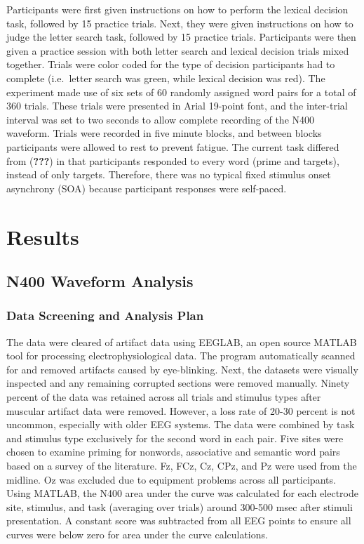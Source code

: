 \documentclass[english,man]{apa6}
\theoremstyle{definition}
\theoremstyle{definition}
\theoremstyle{definition}
\theoremstyle{remark}
\begin{document}
Participants were first given instructions on how to perform the lexical
decision task, followed by 15 practice trials. Next, they were given
instructions on how to judge the letter search task, followed by 15
practice trials. Participants were then given a practice session with
both letter search and lexical decision trials mixed together. Trials
were color coded for the type of decision participants had to complete
(i.e.~letter search was green, while lexical decision was red). The
experiment made use of six sets of 60 randomly assigned word pairs for a
total of 360 trials. These trials were presented in Arial 19-point font,
and the inter-trial interval was set to two seconds to allow complete
recording of the N400 waveform. Trials were recorded in five minute
blocks, and between blocks participants were allowed to rest to prevent
fatigue. The current task differed from ({\textbf{???}}) in that
participants responded to every word (prime and targets), instead of
only targets. Therefore, there was no typical fixed stimulus onset
asynchrony (SOA) because participant responses were self-paced.

\section{Results}\label{results}

\subsection{N400 Waveform Analysis}\label{n400-waveform-analysis}

\subsubsection{Data Screening and Analysis
Plan}\label{data-screening-and-analysis-plan}

The data were cleared of artifact data using EEGLAB, an open source
MATLAB tool for processing electrophysiological data. The program
automatically scanned for and removed artifacts caused by eye-blinking.
Next, the datasets were visually inspected and any remaining corrupted
sections were removed manually. Ninety percent of the data was retained
across all trials and stimulus types after muscular artifact data were
removed. However, a loss rate of 20-30 percent is not uncommon,
especially with older EEG systems. The data were combined by task and
stimulus type exclusively for the second word in each pair. Five sites
were chosen to examine priming for nonwords, associative and semantic
word pairs based on a survey of the literature. Fz, FCz, Cz, CPz, and Pz
were used from the midline. Oz was excluded due to equipment problems
across all participants. Using MATLAB, the N400 area under the curve was
calculated for each electrode site, stimulus, and task (averaging over
trials) around 300-500 msec after stimuli presentation. A constant score
was subtracted from all EEG points to ensure all curves were below zero
for area under the curve calculations.
\end{document}
